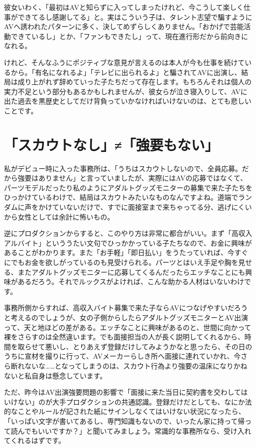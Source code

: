\documentclass[12pt,UTF8]{ctexbook}
\begin{document}
彼女いわく、「最初はAVと知らずに入ってしまったけれど、今こうして楽しく仕事ができてるし感謝してる」と。実はこういう子は、タレント志望で騙すようにAVへ誘われたパターンに多く、決してめずらしくありません。「おかげで芸能活動できているし」とか、「ファンもできたし」って、現在進行形だから前向きになれる。

けれど、そんなふうにポジティブな意見が言えるのは本人が今も仕事を続けているから。「有名になれるよ」「テレビに出られるよ」と騙されてAVに出演し、結局は成り上がれず辞めていった子たちだって存在します。もちろんそれは個人の実力不足という部分もあるかもしれませんが、彼女らが泣き寝入りして、AVに出た過去を黒歴史としてだけ背負っていかなければいけないのは、とても悲しいことです。

\section{「スカウトなし」≠「強要もない」}

私がデビュー時に入った事務所は、「うちはスカウトしないので、全員応募。だから強要はありません」と言っていましたが、実際にはAVの応募ではなくて、パーツモデルだったり私のようにアダルトグッズモニターの募集で来た子たちをひっかけているわけで、結局はスカウトみたいなものなんですよね。道端でランダムに声をかけていないだけで、すでに面接室まで来ちゃってる分、逃げにくいから女性としては余計に怖いもの。

逆にプロダクションからすると、このやり方は非常に都合がいい。まず「高収入アルバイト」といううたい文句でひっかかっている子たちなので、お金に興味があることがわかります。また「お手軽」「即日払い」をうたっていれば、今すぐにでもお金を欲しがっているのも見受けられる。パーツとはいえ手足や胸を見せる、またアダルトグッズモニターに応募してくるんだったらエッチなことにも興味があるだろう。それでルックスがよければ、こんな助かる人材はいないわけです。

事務所側からすれば、高収入バイト募集で来た子ならAVにつなげやすいだろうと考えるのでしょうが、女の子側からしたらアダルトグッズモニターとAV出演って、天と地ほどの差がある。エッチなことに興味があるのと、世間に向かって裸をさらすのは全然違います。でも面接担当の人が長く説明してくれるから、時間を取らせて悪いし、とりあえず登録だけしてみようかなと思ったら、その日のうちに宣材を撮りに行って、AVメーカーらしき所へ面接に連れていかれ、今さら断れないな……となってしまうのは、スカウト行為より強要の温床になりかねないと私自身は懸念しています。

ただ、昨今はAV出演強要問題の影響で「面接に来た当日に契約書を交わしてはいけない」のが大手プロダクションの共通認識。登録だけだとしても、なにか法的なことやルールが記された紙にサインしなくてはいけない状況になったら、「いっぱい文字が書いてあるし、専門知識もないので、いったん家に持って帰って読んでもいいですか？」と聞いてみましょう。常識的な事務所なら、受け入れてくれるはずです。
\end{document}
